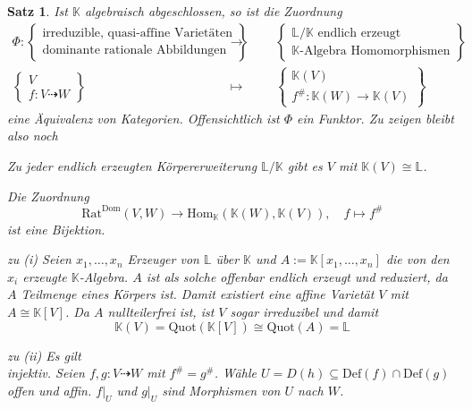 \documentclass[11pt]{book}
\newtheorem{theorem}{Satz}[section]
\theoremstyle{nonumberbreak}
\newenvironment{pr}[1][]{\ifthenelse{\equal{#1}{}}{\proof}{\proof[#1]}\rm}{\endproof}
\begin{document}
\begin{spacing}{1.3}
\begin{theorem}
Ist $\mathbb{K}$ algebraisch abgeschlossen, so ist die Zuordnung
\begin{alignat*}{5}
\Phi: \begin{Bmatrix} \textrm{irreduzible, quasi-affine Varietäten} \\ \textrm{dominante rationale Abbildungen} \end{Bmatrix} \quad &\longrightarrow \quad &&\begin{Bmatrix} \mathbb{L}/\mathbb{K} \textrm{ endlich erzeugt } \\ \mathbb{K}\textrm{-Algebra Homomorphismen} \end{Bmatrix} \\[12pt]
\begin{Bmatrix} V \\ f: V \dashrightarrow W \end{Bmatrix} \quad &\mapsto \quad && \begin{Bmatrix} \mathbb{K}(V) \\ f^\#: \mathbb{K}(W) \longrightarrow \mathbb{K}(V) \end{Bmatrix}
\end{alignat*}
eine Äquivalenz von Kategorien.
\begin{pr}
Offensichtlich ist $\Phi$ ein Funktor. Zu zeigen bleibt also noch 
\begin{compactenum}
\item Zu jeder endlich erzeugten Körpererweiterung $\mathbb{L}/\mathbb{K}$ gibt es $V$ mit $\mathbb{K}(V)\cong \mathbb{L}$.
\item Die Zuordnung 
$$\textrm{Rat}^{\textrm{Dom}}(V,W) \longrightarrow \textrm{Hom}_{\mathbb{K}}(\mathbb{K}(W), \mathbb{K}(V)), \quad f \mapsto f^\#$$
ist eine Bijektion.
\item[\textit{zu} (i)] Seien $x_1, \ldots, x_n$ Erzeuger von $\mathbb{L}$ über $\mathbb{K}$ und $A:= \mathbb{K}[x_1, \ldots, x_n]$ die von den $x_i$ erzeugte $\mathbb{K}$-Algebra. $A$ ist als solche offenbar endlich erzeugt und reduziert, da $A$ Teilmenge eines Körpers ist. Damit existiert eine affine Varietät $V$ mit $A \cong \mathbb{K}[V]$. Da $A$ nullteilerfrei ist, ist $V$ sogar irreduzibel und damit
$$\mathbb{K}(V) = \textrm{Quot}(\mathbb{K}[V]) \cong \textrm{Quot}(A) = \mathbb{L}$$
\item[\textit{zu} (ii)] Es gilt\\
\textit{injektiv.} Seien $f,g:V \dashrightarrow W$ mit $f^\# = g^\#$. Wähle $U=D(h) \subseteq \textrm{Def}(f) \cap \textrm{Def}(g)$ offen und affin. $f\vert _U$ und $g \vert_U$ sind Morphismen von $U$ nach $W$.\\

\end{compactenum}
\end{pr}
\end{theorem}
\end{spacing}
\end{document}
